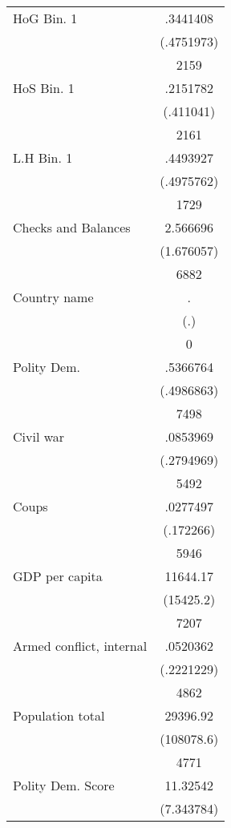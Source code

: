 {\begin{longtable}{l*{1}{c}}
HoG Bin. 1          &    .3441408\\
                    &  (.4751973)\\
                    &        2159\\
HoS Bin. 1          &    .2151782\\
                    &   (.411041)\\
                    &        2161\\
L.H Bin. 1          &    .4493927\\
                    &  (.4975762)\\
                    &        1729\\
Checks and Balances &    2.566696\\
                    &  (1.676057)\\
                    &        6882\\
Country name        &           .\\
                    &         (.)\\
                    &           0\\
Polity Dem.         &    .5366764\\
                    &  (.4986863)\\
                    &        7498\\
Civil war           &    .0853969\\
                    &  (.2794969)\\
                    &        5492\\
Coups               &    .0277497\\
                    &   (.172266)\\
                    &        5946\\
GDP per capita      &    11644.17\\
                    &   (15425.2)\\
                    &        7207\\
Armed conflict, internal&    .0520362\\
                    &  (.2221229)\\
                    &        4862\\
Population total    &    29396.92\\
                    &  (108078.6)\\
                    &        4771\\
Polity Dem. Score   &    11.32542\\
                    &  (7.343784)\\

\end{longtable}}

